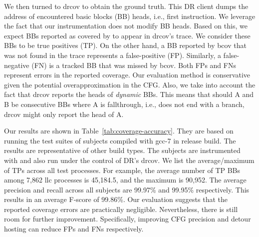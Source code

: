 We then turned to \textsf{drcov} to obtain the ground truth.
This DR client dumps the address of encountered basic blocks (BB) heads, i.e., first instruction.
We leverage the fact that our instrumentation does not modify BB heads.
Based on this, we expect BBs reported as covered by {\bcov} to appear in \textsf{drcov}'s trace.
We consider these BBs to be true positives (TP).
On the other hand, a BB reported by bcov that was not found in the trace represents a false-positive (FP). 
Similarly, a false-negative (FN) is a tracked BB that was missed by bcov. 
Both FPs and FNs represent errors in the reported coverage. 
Our evaluation method is conservative given the potential overapproximation in the CFG.
Also, we take into account the fact that \textsf{drcov} reports the heads of \textit{dynamic} BBs. 
This means that should A and B be consecutive BBs where A is fallthrough, i.e., does not end with a branch, 
\textsf{drcov} might only report the head of A.


Our results are shown in Table~\ref{tab:coverage-accuracy}.
They are based on running the test suites of subjects compiled with \textsf{gcc-7} in release build.
The results are representative of other build types.
The subjects are instrumented with {\bcov} and also run under the control of DR's \textsf{drcov}.
We list the average/maximum of TPs across all test processes. 
For example, the average number of TP BBs among 7,862 \textsf{llc} processes is 45,184.5, and the maximum is 90,952.
The average precision and recall across all subjects are 99.97\% and 99.95\% respectively.
This results in an average F-score of 99.86\%.
Our evaluation suggests that the reported coverage errors are practically negligible.
Nevertheless, there is still room for further improvement. 
Specifically, improving CFG precision and detour hosting can reduce FPs and FNs respectively. 


